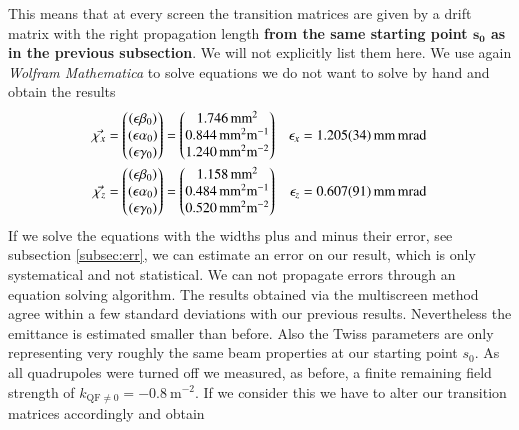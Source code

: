 \documentclass[11pt,a4paper,notitlepage]{scrartcl}
\begin{document}
This means that at every screen the transition matrices are given by a drift matrix with the right propagation length \textbf{from the same starting point $\mathbf{ s_0}$ as in the previous subsection}. We will not explicitly list them here. We use again \emph{Wolfram Mathematica} to solve equations we do not want to solve by hand and obtain the results 
\begin{align*}
	\vec{\chi_x}=\begin{pmatrix}
		(\epsilon\beta_0)\\
		(\epsilon\alpha_0)\\
		(\epsilon\gamma_0)\\
	\end{pmatrix}=\begin{pmatrix}
	\SI{1.746}{\milli\m^2}\\
	\SI{0.844}{\milli m^2m^{-1}}\\
	\SI{1.240}{\milli m^2m^{-2}}
\end{pmatrix} && \epsilon_{x}=\SI{1.205\pm0.034}{\milli\m\milli\radian}\\
\vec{\chi_z}=\begin{pmatrix}
	(\epsilon\beta_0)\\
	(\epsilon\alpha_0)\\
	(\epsilon\gamma_0)\\
\end{pmatrix}=\begin{pmatrix}
	\SI{1.158}{\milli\m^2}\\
	\SI{0.484}{\milli m^2m^{-1}}\\
	\SI{0.520}{\milli m^2m^{-2}}
\end{pmatrix} && \epsilon_{z}=\SI{0.607\pm0.091}{\milli\m\milli\radian}
\end{align*}
If we solve the equations with the widths plus and minus their error, see subsection \ref{subsec:err}, we can estimate an error on our result, which is only systematical and not statistical. We can not propagate errors through an equation solving algorithm. The results obtained via the multiscreen method agree within a few standard deviations with our previous results. Nevertheless the emittance is estimated smaller than before. Also the Twiss parameters are only representing very roughly the same beam properties at our starting point $s_0$. As all quadrupoles were turned off we measured, as before, a finite remaining field strength of $k_{\text{QF}\neq0}=\SI{-0.8}{\m^{-2}}$. If we consider this we have to alter our transition matrices accordingly and obtain 
\end{document}

